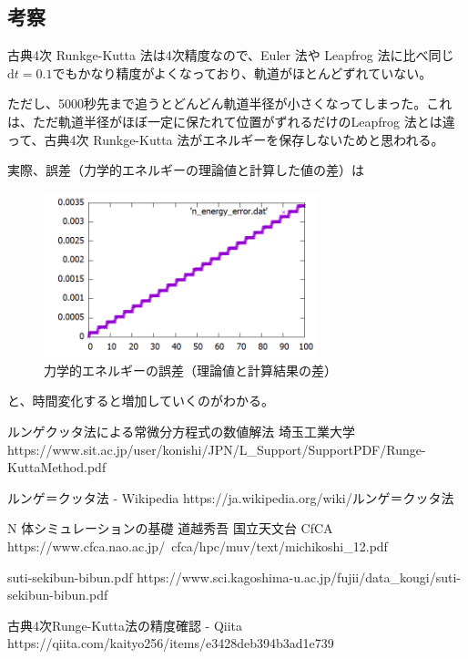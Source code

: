\documentclass[a4paper,twoside]{jarticle}
\begin{document}
\subsection{考察}
古典4次 Runkge-Kutta 法は4次精度なので、Euler 法や Leapfrog 法に比べ同じ$\mathrm{d}t=0.1$でもかなり精度がよくなっており、軌道がほとんどずれていない。

ただし、5000秒先まで追うとどんどん軌道半径が小さくなってしまった。これは、ただ軌道半径がほぼ一定に保たれて位置がずれるだけのLeapfrog 法とは違って、古典4次 Runkge-Kutta 法がエネルギーを保存しないためと思われる。

実際、誤差（力学的エネルギーの理論値と計算した値の差）は

\begin{figure}[H]
\begin{center}
\includegraphics[width=8cm]{../cpp/out/runge-kutta/n_error.png}
\end{center}
\caption{力学的エネルギーの誤差（理論値と計算結果の差）}
\end{figure}

と、時間変化すると増加していくのがわかる。

\begin{thebibliography}{99}
ルンゲクッタ法による常微分方程式の数値解法 埼玉工業大学
https://www.sit.ac.jp/user/konishi/JPN/L\_Support/SupportPDF/Runge-KuttaMethod.pdf

ルンゲ＝クッタ法 - Wikipedia
https://ja.wikipedia.org/wiki/ルンゲ＝クッタ法

N 体シミュレーションの基礎 道越秀吾 国立天文台 CfCA
https://www.cfca.nao.ac.jp/~cfca/hpc/muv/text/michikoshi\_12.pdf

suti-sekibun-bibun.pdf
https://www.sci.kagoshima-u.ac.jp/fujii/data\_kougi/suti-sekibun-bibun.pdf

古典4次Runge-Kutta法の精度確認 - Qiita
https://qiita.com/kaityo256/items/e3428deb394b3ad1e739

\end{thebibliography}
\end{document}
